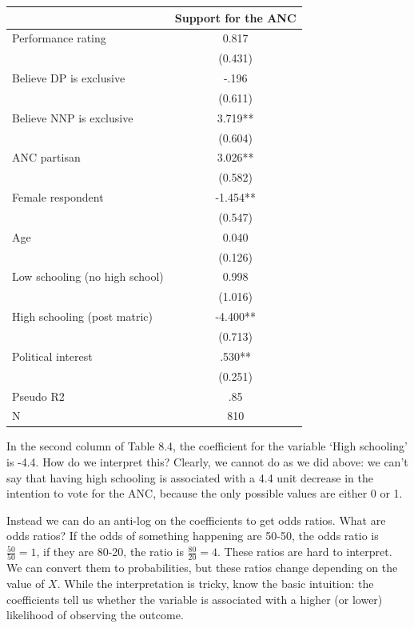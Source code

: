 \documentclass{book}
\begin{document}
\begin{longtable}[]{@{}lc@{}}
\toprule()
& Support for the ANC \\
\midrule()
\endhead
Performance rating & 0.817 \\
& (0.431) \\
Believe DP is exclusive & -.196 \\
& (0.611) \\
Believe NNP is exclusive & 3.719** \\
& (0.604) \\
ANC partisan & 3.026** \\
& (0.582) \\
Female respondent & -1.454** \\
& (0.547) \\
Age & 0.040 \\
& (0.126) \\
Low schooling (no high school) & 0.998 \\
& (1.016) \\
High schooling (post matric) & -4.400** \\
& (0.713) \\
Political interest & .530** \\
& (0.251) \\
Pseudo R2 & .85 \\
N & 810 \\
\bottomrule()
\end{longtable}

In the second column of Table 8.4, the coefficient for the variable `High
schooling' is -4.4. How do we interpret this? Clearly, we cannot do as we did
above: we can't say that having high schooling is associated with a 4.4 unit
decrease in the intention to vote for the ANC, because the only possible
values are either 0 or 1.

Instead we can do an anti-log on the coefficients to get odds ratios. What are
odds ratios? If the odds of something happening are 50-50, the odds ratio is
\(\frac{50}{50}=1\), if they are 80-20, the ratio is \(\frac{80}{20}=4\).
These ratios are hard to interpret. We can convert them to probabilities, but
these ratios change depending on the value of \(X\). While the interpretation
is tricky, know the basic intuition: the coefficients tell us whether the
variable is associated with a higher (or lower) likelihood of observing the
outcome.
\end{document}
